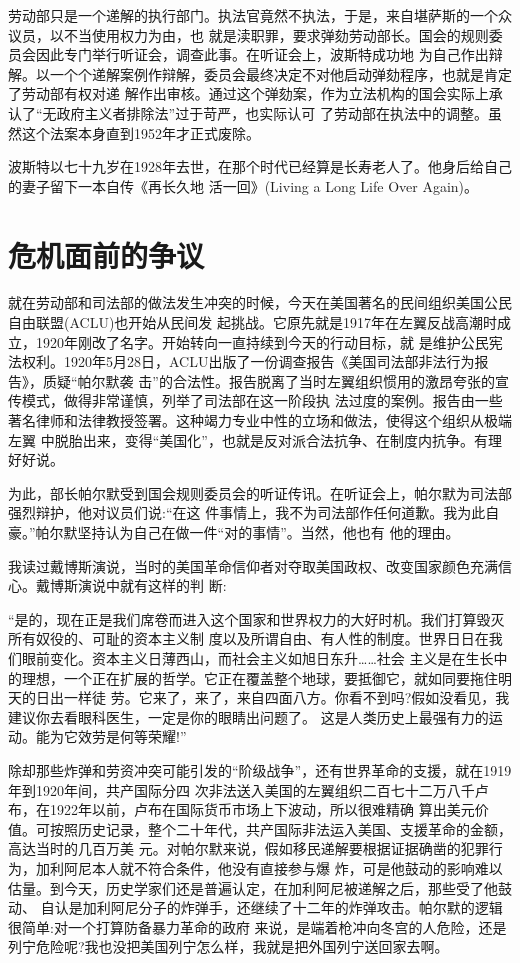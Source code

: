 \documentclass[10pt]{article}
\begin{document}
{劳动部只是一个递解的执行部门。执法官竟然不执法，于是，来自堪萨斯的一个众议员，以不当使用权力为由，也
就是渎职罪，要求弹劾劳动部长。国会的规则委员会因此专门举行听证会，调查此事。在听证会上，波斯特成功地
为自己作出辩解。以一个个递解案例作辩解，委员会最终决定不对他启动弹劾程序，也就是肯定了劳动部有权对递
解作出审核。通过这个弹劾案，作为立法机构的国会实际上承认了``无政府主义者排除法''过于苛严，也实际认可
了劳动部在执法中的调整。虽然这个法案本身直到1952年才正式废除。

波斯特以七十九岁在1928年去世，在那个时代已经算是长寿老人了。他身后给自己的妻子留下一本自传《再长久地
活一回》(Living a Long Life Over Again)。

\pagebreak
\section{危机面前的争议}

就在劳动部和司法部的做法发生冲突的时候，今天在美国著名的民间组织美国公民自由联盟(ACLU)也开始从民间发
起挑战。它原先就是1917年在左翼反战高潮时成立，1920年刚改了名字。开始转向一直持续到今天的行动目标，就
是维护公民宪法权利。1920年5月28日，ACLU出版了一份调查报告《美国司法部非法行为报告》，质疑``帕尔默袭
击''的合法性。报告脱离了当时左翼组织惯用的激昂夸张的宣传模式，做得非常谨慎，列举了司法部在这一阶段执
法过度的案例。报告由一些著名律师和法律教授签署。这种竭力专业中性的立场和做法，使得这个组织从极端左翼
中脱胎出来，变得``美国化''，也就是反对派合法抗争、在制度内抗争。有理好好说。

为此，部长帕尔默受到国会规则委员会的听证传讯。在听证会上，帕尔默为司法部强烈辩护，他对议员们说:``在这
件事情上，我不为司法部作任何道歉。我为此自豪。''帕尔默坚持认为自己在做一件``对的事情''。当然，他也有
他的理由。

我读过戴博斯演说，当时的美国革命信仰者对夺取美国政权、改变国家颜色充满信心。戴博斯演说中就有这样的判
断:

``是的，现在正是我们席卷而进入这个国家和世界权力的大好时机。我们打算毁灭所有奴役的、可耻的资本主义制
度以及所谓自由、有人性的制度。世界日日在我们眼前变化。资本主义日薄西山，而社会主义如旭日东升……社会
主义是在生长中的理想，一个正在扩展的哲学。它正在覆盖整个地球，要抵御它，就如同要拖住明天的日出一样徒
劳。它来了，来了，来自四面八方。你看不到吗?假如没看见，我建议你去看眼科医生，一定是你的眼睛出问题了。
这是人类历史上最强有力的运动。能为它效劳是何等荣耀!''

除却那些炸弹和劳资冲突可能引发的``阶级战争''，还有世界革命的支援，就在1919年到1920年间，共产国际分四
次非法送入美国的左翼组织二百七十二万八千卢布，在1922年以前，卢布在国际货币市场上下波动，所以很难精确
算出美元价值。可按照历史记录，整个二十年代，共产国际非法运入美国、支援革命的金额，高达当时的几百万美
元。对帕尔默来说，假如移民递解要根据证据确凿的犯罪行为，加利阿尼本人就不符合条件，他没有直接参与爆
炸，可是他鼓动的影响难以估量。到今天，历史学家们还是普遍认定，在加利阿尼被递解之后，那些受了他鼓动、
自认是加利阿尼分子的炸弹手，还继续了十二年的炸弹攻击。帕尔默的逻辑很简单:对一个打算防备暴力革命的政府
来说，是端着枪冲向冬宫的人危险，还是列宁危险呢?我也没把美国列宁怎么样，我就是把外国列宁送回家去啊。

}
\end{document}
